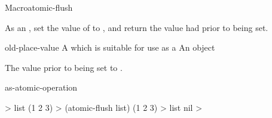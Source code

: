 \documentclass[10pt,twoside,english,pdftex]{article}
\begin{document}

\begin{functiondoc}{Macro}{atomic-flush}{ 
    }
%

\fnsyntax

\fnpurpose As an , set the value of
 to \nil, and return the value  had
prior to being set.

\fnpackage {}

\fnmodule {}

\fnargs
\begin{args}{old-place-value}
\arg[place] A  which is suitable for use as a
 An object
\end{args}

\fnreturns The  value prior to being set to \nil.

\begin{alsos}{as-atomic-operation}
\end{alsos}

\fnexample
%
\W\supp
\begin{example}
  > list
  (1 2 3)
  > (atomic-flush list)
  (1 2 3)
  > list
  nil
  >
\end{example}

\end{functiondoc}

\end{document}
